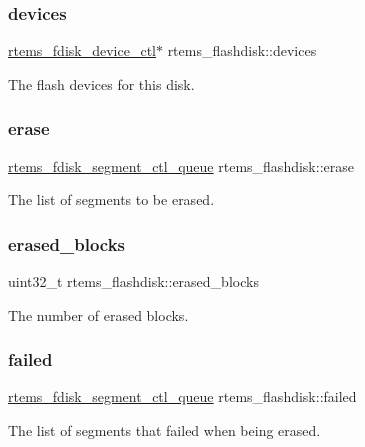 \subsubsection{\texorpdfstring{devices}{devices}}
{\footnotesize\ttfamily \mbox{\hyperlink{structrtems__fdisk__device__ctl}{rtems\+\_\+fdisk\+\_\+device\+\_\+ctl}}$\ast$ rtems\+\_\+flashdisk\+::devices}

The flash devices for this disk. \mbox{\label{structrtems__flashdisk_ac8d733bbcd13795eac6cc35c3bacf742}} 
\subsubsection{\texorpdfstring{erase}{erase}}
{\footnotesize\ttfamily \mbox{\hyperlink{structrtems__fdisk__segment__ctl__queue}{rtems\+\_\+fdisk\+\_\+segment\+\_\+ctl\+\_\+queue}} rtems\+\_\+flashdisk\+::erase}

The list of segments to be erased. \mbox{\label{structrtems__flashdisk_a6020f878c71c545f444c813a777c9c37}} 
\subsubsection{\texorpdfstring{erased\_blocks}{erased\_blocks}}
{\footnotesize\ttfamily uint32\+\_\+t rtems\+\_\+flashdisk\+::erased\+\_\+blocks}

The number of erased blocks. \mbox{\label{structrtems__flashdisk_a7f93ff069e9bfb15847029cecf8f1ef8}} 
\subsubsection{\texorpdfstring{failed}{failed}}
{\footnotesize\ttfamily \mbox{\hyperlink{structrtems__fdisk__segment__ctl__queue}{rtems\+\_\+fdisk\+\_\+segment\+\_\+ctl\+\_\+queue}} rtems\+\_\+flashdisk\+::failed}

The list of segments that failed when being erased. \mbox{\label{structrtems__flashdisk_a0be9bcc85eaf41c14c538c14d5ead3a3}} 
